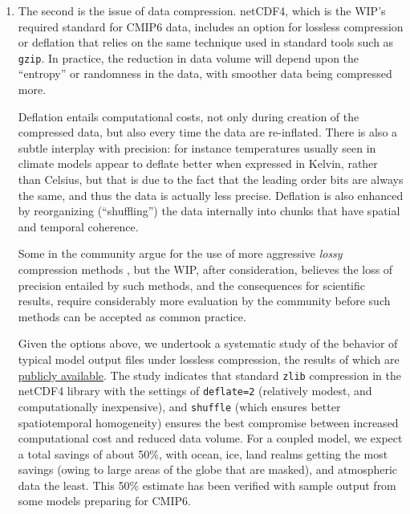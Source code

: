 \documentclass[gmd,manuscript]{copernicus}
\newcommand{\pipref}[1] {\citep{ref:#1}}
\begin{document}
\begin{enumerate}
\item The second is the issue of data compression. netCDF4, which is
  the WIP's required standard for CMIP6 data, includes an option
  for lossless compression or deflation \pipref{zivlempel1977} that
  relies on the same technique used in standard tools such
  as \texttt{gzip}. In practice, the reduction in data volume will
  depend upon the ``entropy'' or randomness in the data, with
  smoother data being compressed more.

  Deflation entails computational costs, not only during creation of
  the compressed data, but also every time the data are re-inflated.
  There is also a subtle interplay with precision: for instance
  temperatures usually seen in climate models appear to deflate better
  when expressed in Kelvin, rather than Celsius, but that is due to
  the fact that the leading order bits are always the same, and thus
  the data is actually less precise. Deflation is also enhanced by
  reorganizing (``shuffling'') the data internally into chunks that
  have spatial and temporal coherence.

  Some in the community argue for the use of more aggressive
  \emph{lossy} compression methods \pipref{bakeretal2016}, but the
  WIP, after consideration, believes the loss of precision entailed by
  such methods, and the consequences for scientific results, require
  considerably more evaluation by the community before such methods
  can be accepted as common practice.

  Given the options above, we undertook a systematic study of the
  behavior of typical model output files under lossless compression,
  the results of which are \href{https://goo.gl/qkdDnn}{publicly
    available}. The study indicates that standard \texttt{zlib}
  compression in the netCDF4 library with the settings of
  \texttt{deflate=2} (relatively modest, and computationally
  inexpensive), and \texttt{shuffle} (which ensures better
  spatiotemporal homogeneity) ensures the best compromise between
  increased computational cost and reduced data volume. For a coupled
  model, we expect a total savings of about 50\%, with ocean, ice,
  land realms getting the most savings (owing to large areas of the
  globe that are masked), and atmospheric data the least. This 50\%
  estimate has been verified with sample output from some models
  preparing for CMIP6.
\end{enumerate}
\end{document}
